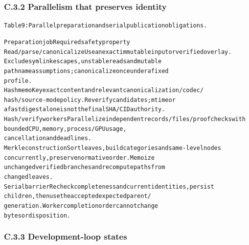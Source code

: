 \documentclass{article}
\begin{document}
\subsubsection*{C.3.2 Parallelism that preserves identity}


\begingroup\fontsize{7}{8.4}\selectfont
\begin{alltt}
Table 9: Parallel preparation and serial publication obligations.
\end{alltt}\endgroup

\begingroup\fontsize{7}{8.4}\selectfont
\begin{alltt}
Preparation job                             Required safety property
Read / parse / canonicalize                 Use an exact immutable input or verified overlay.
                                            Exclude symlink escapes, unstable reads and mutable
                                            pathname assumptions; canonicalize once under a fixed
                                            profile.
Hash memo                                   Key exact content and relevant canonicalization/codec/
                                            hash/source-mode policy. Reverify candidates; mtime or
                                            a fast digest alone is not the final SHA/CID authority.
Hash / verify workers                       Parallelize independent records/files/proof checks with
                                            bounded CPU, memory, process/GPU usage,
                                            cancellation and deadlines.
Merkle construction                         Sort leaves, build categories and same-level nodes
                                            concurrently, preserve normative order. Memoize
                                            unchanged verified branches and recompute paths from
                                            changed leaves.
Serial barrier                              Recheck completeness and current identities, persist
                                            children, then use the accepted expected parent/
                                            generation. Worker completion order cannot change
                                            bytes or disposition.
\end{alltt}\endgroup



\subsubsection*{C.3.3 Development-loop states}
\end{document}
